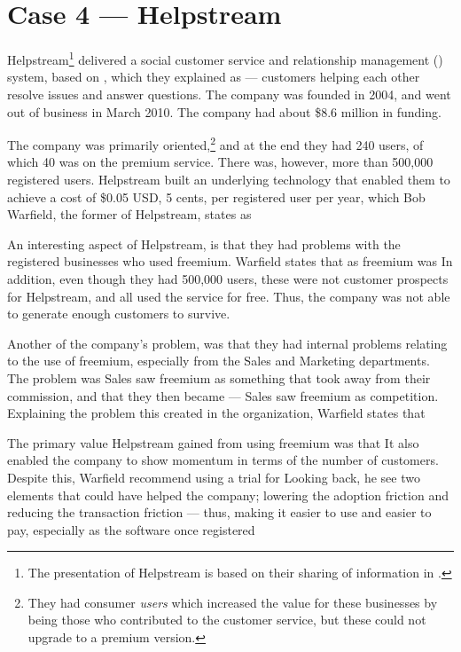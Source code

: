\section{Case 4 --- Helpstream}

Helpstream\footnote{The presentation of Helpstream is based on their sharing of information in \citet{warfield2010,warfield2010b,warfield2010c}.} delivered a social customer service and relationship management () system, based on , which they explained as  --- customers helping each other resolve issues and answer questions. The company was founded in 2004, and went out of business in March 2010. The company had about \$8.6 million  in funding.

The company was primarily  oriented,\footnote{They had consumer \emph{users} which increased the value for these businesses by being those who contributed to the customer service, but these could not upgrade to a premium version.} and at the end they had 240 users, of which 40 was on the premium service. There was, however, more than 500,000 registered users. Helpstream built an underlying technology that enabled them to achieve a cost of \$0.05 USD, 5 cents, per registered user per year, which Bob Warfield, the former  of Helpstream, states as  

An interesting aspect of Helpstream, is that they had problems with the registered businesses who used freemium. Warfield states that  as freemium was  In addition, even though they had 500,000 users, these were not customer prospects for Helpstream, and all used the service for free. Thus, the company was not able to generate enough customers to survive.

Another of the company's problem, was that they had internal problems relating to the use of freemium, especially from the Sales and Marketing departments. The problem was Sales saw freemium as something that took away from their commission, and that they then became  --- Sales saw freemium as competition. Explaining the problem this created in the organization, Warfield states that 

The primary value Helpstream gained from using freemium was that  It also enabled the company to show momentum in terms of the number of customers. Despite this, Warfield recommend using a trial for  Looking back, he see two elements that could have helped the company; lowering the adoption friction and reducing the transaction friction --- thus, making it easier to use and easier to pay, especially as the software once registered 

